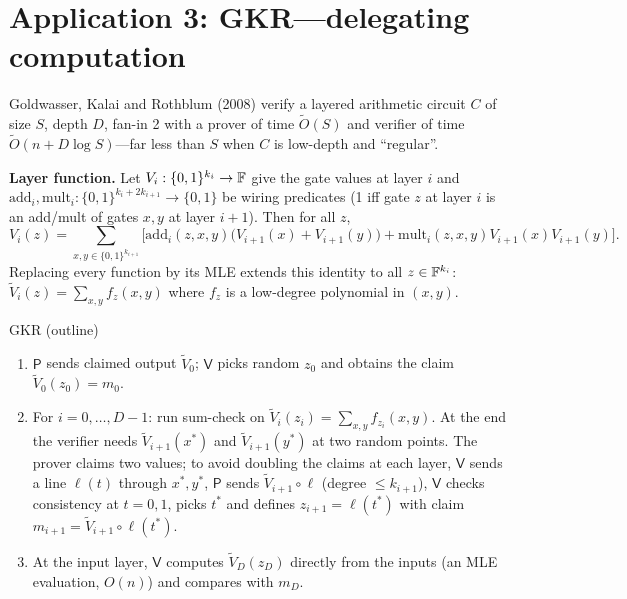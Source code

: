 \documentclass[11pt,a4paper]{report}
\theoremstyle{plain}
\theoremstyle{definition}
\theoremstyle{remark}
\newcommand{\Prv}{\mathsf{P}}\newcommand{\Ver}{\mathsf{V}}
\begin{document}
\section{Application 3: GKR---delegating computation}
\label{sec:gkr}
Goldwasser, Kalai and Rothblum (2008) verify a layered arithmetic circuit $C$ of size $S$, depth $D$, fan-in 2 with a prover of time $\tilde O(S)$ and verifier of time $\tilde O(n+D\log S)$---far less than $S$ when $C$ is low-depth and ``regular''.
\begin{center}
\end{center}
\textbf{Layer function.} Let $V_i:\{0,1\}^{k_i}\to\mathbb{F}$ give the gate values at layer $i$ and $\mathrm{add}_i,\mathrm{mult}_i:\{0,1\}^{k_i+2k_{i+1}}\to\{0,1\}$ be wiring predicates (1 iff gate $z$ at layer $i$ is an add/mult of gates $x,y$ at layer $i+1$). Then for all $z$,
\[
V_i(z)=\sum_{x,y\in\{0,1\}^{k_{i+1}}}\Big[\mathrm{add}_i(z,x,y)\big(V_{i+1}(x)+V_{i+1}(y)\big)+\mathrm{mult}_i(z,x,y)V_{i+1}(x)V_{i+1}(y)\Big].
\]
Replacing every function by its MLE extends this identity to all $z\in\mathbb{F}^{k_i}$: $\tilde V_i(z)=\sum_{x,y}f_{z}(x,y)$ where $f_z$ is a low-degree polynomial in $(x,y)$.
\begin{algorithm}[label=pr:gkr]{GKR (outline)}
\begin{enumerate}
\item $\Prv$ sends claimed output $\tilde V_0$; $\Ver$ picks random $z_0$ and obtains the claim $\tilde V_0(z_0)=m_0$.
\item For $i=0,\dots,D-1$: run sum-check on $\tilde V_i(z_i)=\sum_{x,y}f_{z_i}(x,y)$. At the end the verifier needs $\tilde V_{i+1}(x^*)$ and $\tilde V_{i+1}(y^*)$ at two random points. The prover claims two values; to avoid doubling the claims at each layer, $\Ver$ sends a line $\ell(t)$ through $x^*,y^*$, $\Prv$ sends $\tilde V_{i+1}\circ\ell$ (degree $\le k_{i+1}$), $\Ver$ checks consistency at $t=0,1$, picks $t^*$ and defines $z_{i+1}=\ell(t^*)$ with claim $m_{i+1}=\tilde V_{i+1}\circ\ell(t^*)$.
\item At the input layer, $\Ver$ computes $\tilde V_D(z_D)$ directly from the inputs (an MLE evaluation, $O(n)$) and compares with $m_D$.
\end{enumerate}
\end{algorithm}
\end{document}
